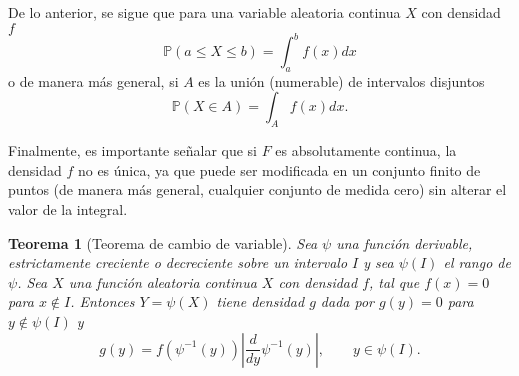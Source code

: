 \documentclass[11pt]{report}
\theoremstyle{break}
\newtheorem{teorema}{Teorema}[chapter]
\theoremstyle{break}
\begin{document}
De lo anterior, se sigue que para una variable aleatoria continua $X$ con densidad $f$
$$
\mathbb{P}(a \leq X \leq b) = \int_{a}^{b}f(x)dx
$$
o de manera más general, si $A$ es la unión (numerable) de intervalos disjuntos
$$
\mathbb{P}(X \in A) = \int_{A}f(x)dx.
$$

Finalmente, es importante señalar que si $F$ es absolutamente continua, la densidad $f$ no es única, ya que puede ser modificada en un conjunto finito de puntos (de manera más general, cualquier conjunto de medida cero) sin alterar el valor de la integral.

\begin{teorema}[Teorema de cambio de variable]
\label{teorema:cambio de variable}
Sea $\psi$ una función derivable, estrictamente creciente o decreciente sobre un intervalo $I$ y sea $\psi(I)$ el rango de $\psi$. Sea $X$ una función aleatoria continua $X$ con densidad $f$, tal que $f(x) = 0$ para $x \notin I$. Entonces $Y = \psi(X)$ tiene densidad $g$ dada por $g(y) = 0$ para $y \notin \psi(I)$ y 
$$
g(y) = f(\psi^{-1}(y)) \left| \dfrac{d}{dy}\psi^{-1}(y)\right|, \qquad y \in \psi(I).
$$
\end{teorema}
\end{document}

